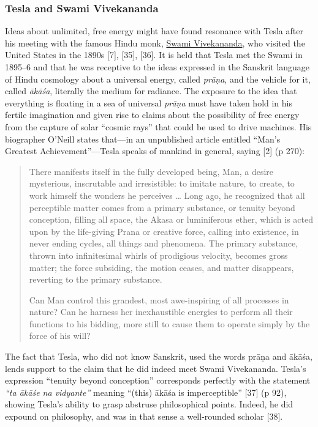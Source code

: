 \documentclass[
  12pt,
  british,
  a4paper,
]{article}
\begin{document}
\hypertarget{tesla-and-swami-vivekananda}{%
\subsubsection{Tesla and Swami
Vivekananda}\label{tesla-and-swami-vivekananda}}

Ideas about unlimited, free energy might have found resonance with Tesla
after his meeting with the famous Hindu monk,
\href{https://en.wikipedia.org/wiki/Swami_Vivekananda}{Swami
Vivekananda}, who visited the United States in the 1890s {[}7{]},
{[}35{]}, {[}36{]}. It is held that Tesla met the Swami in 1895--6 and
that he was receptive to the ideas expressed in the Sanskrit language of
Hindu cosmology about a universal energy, called \emph{prāṇa}, and the
vehicle for it, called \emph{ākāśa}, literally the medium for radiance.
The exposure to the idea that everything is floating in a sea of
universal \emph{prāṇa} must have taken hold in his fertile imagination
and given rise to claims about the possibility of free energy from the
capture of solar ``cosmic rays'' that could be used to drive machines.
His biographer O'Neill states that---in an unpublished article entitled
``Man's Greatest Achievement''---Tesla speaks of mankind in general,
saying {[}2{]} (p 270):

\begin{quote}
There manifests itself in the fully developed being, Man, a desire
mysterious, inscrutable and irresistible: to imitate nature, to create,
to work himself the wonders he perceives \ldots{} Long ago, he
recognized that all perceptible matter comes from a primary substance,
or tenuity beyond conception, filling all space, the Akasa or
luminiferous ether, which is acted upon by the life-giving Prana or
creative force, calling into existence, in never ending cycles, all
things and phenomena. The primary substance, thrown into infinitesimal
whirls of prodigious velocity, becomes gross matter; the force
subsiding, the motion ceases, and matter disappears, reverting to the
primary substance.

Can Man control this grandest, most awe-inspiring of all processes in
nature? Can he harness her inexhaustible energies to perform all their
functions to his bidding, more still to cause them to operate simply by
the force of his will?
\end{quote}

The fact that Tesla, who did not know Sanskrit, used the words prāṇa and
ākāśa, lends support to the claim that he did indeed meet Swami
Vivekananda. Tesla's expression ``tenuity beyond conception''
corresponds perfectly with the statement \emph{``ta ākāśe na vidyante''}
meaning ``(this) ākāśa is imperceptible'' {[}37{]} (p 92), showing
Tesla's ability to grasp abstruse philosophical points. Indeed, he did
expound on philosophy, and was in that sense a well-rounded scholar
{[}38{]}.
\end{document}
